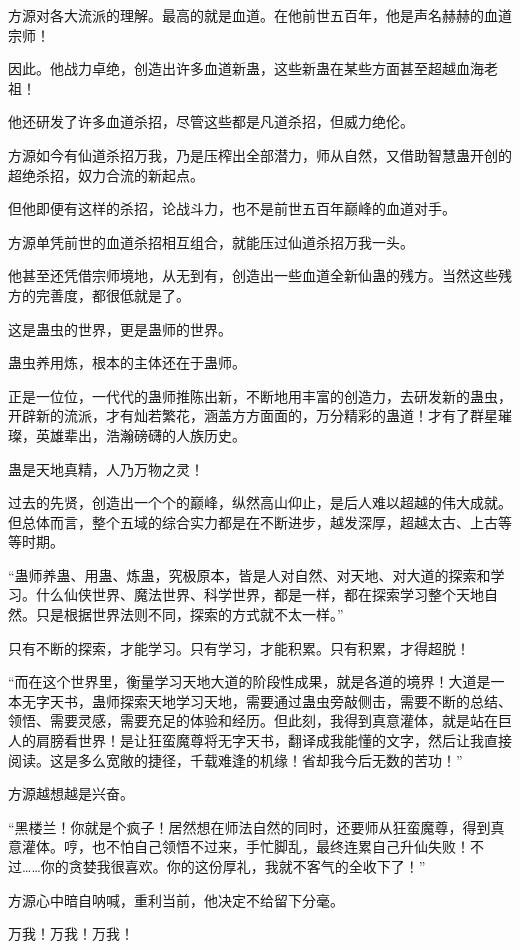 \begin{this_body}
方源对各大流派的理解。最高的就是血道。在他前世五百年，他是声名赫赫的血道宗师！

因此。他战力卓绝，创造出许多血道新蛊，这些新蛊在某些方面甚至超越血海老祖！

他还研发了许多血道杀招，尽管这些都是凡道杀招，但威力绝伦。

方源如今有仙道杀招万我，乃是压榨出全部潜力，师从自然，又借助智慧蛊开创的超绝杀招，奴力合流的新起点。

但他即便有这样的杀招，论战斗力，也不是前世五百年巅峰的血道对手。

方源单凭前世的血道杀招相互组合，就能压过仙道杀招万我一头。

他甚至还凭借宗师境地，从无到有，创造出一些血道全新仙蛊的残方。当然这些残方的完善度，都很低就是了。

这是蛊虫的世界，更是蛊师的世界。

蛊虫养用炼，根本的主体还在于蛊师。

正是一位位，一代代的蛊师推陈出新，不断地用丰富的创造力，去研发新的蛊虫，开辟新的流派，才有灿若繁花，涵盖方方面面的，万分精彩的蛊道！才有了群星璀璨，英雄辈出，浩瀚磅礴的人族历史。

蛊是天地真精，人乃万物之灵！

过去的先贤，创造出一个个的巅峰，纵然高山仰止，是后人难以超越的伟大成就。但总体而言，整个五域的综合实力都是在不断进步，越发深厚，超越太古、上古等等时期。

“蛊师养蛊、用蛊、炼蛊，究极原本，皆是人对自然、对天地、对大道的探索和学习。什么仙侠世界、魔法世界、科学世界，都是一样，都在探索学习整个天地自然。只是根据世界法则不同，探索的方式就不太一样。”

只有不断的探索，才能学习。只有学习，才能积累。只有积累，才得超脱！

“而在这个世界里，衡量学习天地大道的阶段性成果，就是各道的境界！大道是一本无字天书，蛊师探索天地学习天地，需要通过蛊虫旁敲侧击，需要不断的总结、领悟、需要灵感，需要充足的体验和经历。但此刻，我得到真意灌体，就是站在巨人的肩膀看世界！是让狂蛮魔尊将无字天书，翻译成我能懂的文字，然后让我直接阅读。这是多么宽敞的捷径，千载难逢的机缘！省却我今后无数的苦功！”

方源越想越是兴奋。

“黑楼兰！你就是个疯子！居然想在师法自然的同时，还要师从狂蛮魔尊，得到真意灌体。哼，也不怕自己领悟不过来，手忙脚乱，最终连累自己升仙失败！不过……你的贪婪我很喜欢。你的这份厚礼，我就不客气的全收下了！”

方源心中暗自呐喊，重利当前，他决定不给留下分毫。

万我！万我！万我！


\end{this_body}
